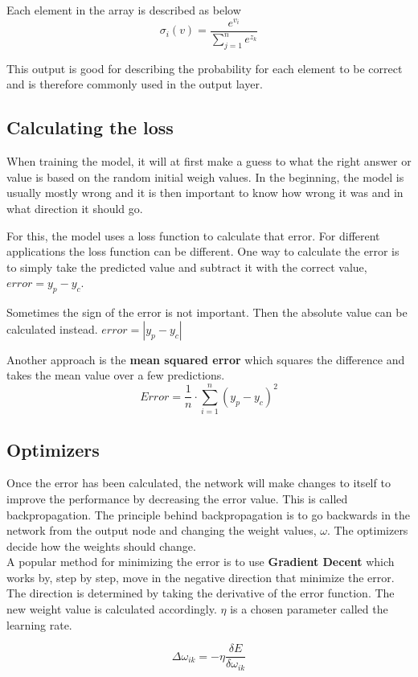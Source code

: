 Each element in the array is described as below
\[ \sigma_i(v) = \frac{e^{v_i}}{\displaystyle\sum_{j=1}^{n} e^{z_k}} \]

This output is good for describing the probability for each element to be correct and is therefore commonly used
in the output layer.

\subsection{Calculating the loss}
When training the model, it will at first make a guess to what the right answer or value is based on the random initial weigh values. In the beginning, the model is usually mostly wrong and it is then important to know how wrong it was and in what direction it should go.

For this, the model uses a loss function to calculate that error. For different applications the loss function can be different.
One way to calculate the error is to simply take the predicted value and subtract it with the correct value, $ error = y_p - y_c $.

Sometimes the sign of the error is not important. Then the absolute value can 
be calculated instead. $error = |y_p - y_c| $

Another approach is the \textbf{mean squared error} which squares the difference and takes the mean value over a few predictions.
\[Error = \frac{1}{n} \cdot \displaystyle\sum_{i=1}^{n} (y_p - y_c)^{2} \]


\subsection{Optimizers}
\label{subSec:optimizers}
Once the error has been calculated, the network will make changes to itself to improve the performance by decreasing the error value. This is called backpropagation.
The principle behind backpropagation is to go backwards in the network from the output node and changing the weight values, $ \omega $.
The optimizers decide how the weights should change. \\

A popular method for minimizing the error is to use \textbf{Gradient Decent} which works
by, step by step, move in the negative direction that minimize the error.
The direction is determined by taking the derivative of the error function.
The new weight value is calculated accordingly. $\eta$ is a chosen parameter called the learning rate.

\[ \Delta \omega_{ik} = -\eta \frac{\delta E}{\delta \omega_{ik}} \]

